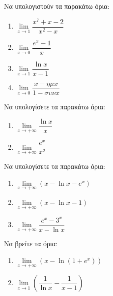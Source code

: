 \documentclass{presentation}
\begin{document}
\begin{askisi}
    Να υπολογιστούν τα παρακάτω όρια:
    \begin{enumerate}
        \item<1-> $\lim\limits_{x \to 1}{ \dfrac{x^7+x-2}{x^2-x} }$
        \item<2-> $\lim\limits_{x \to 0}{ \dfrac{e^x-1}{x} }$
        \item<3-> $\lim\limits_{x \to 1}{ \dfrac{\ln x}{x-1} }$
        \item<4-> $\lim\limits_{x \to 0}{ \dfrac{x-ημx}{1-συνx} }$
    \end{enumerate}

\end{askisi}

\begin{askisi}
    Να υπολογίσετε τα παρακάτω όρια:
    \begin{enumerate}
        \item<1-> $\lim\limits_{x \to +\infty}{ \dfrac{\ln x}{x} }$
        \item<2-> $\lim\limits_{x \to +\infty}{ \dfrac{e^x}{x^2} }$
    \end{enumerate}

\end{askisi}

\begin{askisi}
    Να υπολογίσετε τα παρακάτω όρια:
    \begin{enumerate}
        \item<1-> $\lim\limits_{x \to +\infty}{ (x-\ln x-e^x) }$
        \item<2-> $\lim\limits_{x \to +\infty}{ (x-\ln x-1) }$
        \item<3-> $\lim\limits_{x \to +\infty}{ \dfrac{e^x-3^x}{x-\ln x} }$
    \end{enumerate}

\end{askisi}

\begin{askisi}
    Να βρείτε τα όρια:
    \begin{enumerate}
        \item<1-> $\lim\limits_{x \to +\infty}{ (x-\ln (1+e^x)) }$
        \item<2-> $\lim\limits_{x \to 1}{ \left( \dfrac{1}{\ln x} - \dfrac{1}{x-1} \right)  }$
    \end{enumerate}

\end{askisi}
\end{document}
